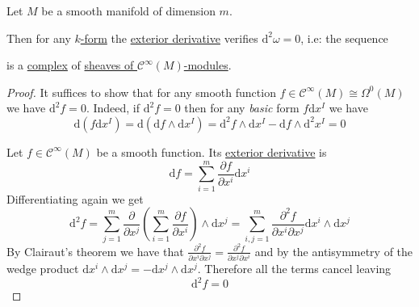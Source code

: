 \documentclass[../../main]{subfiles}
\begin{document}
\begin{lemma} \label{lemma:double-exterior-derivative-is-zero}
  Let \(M\) be a smooth manifold of dimension \(m\).

  Then for any \hyperref[def:smooth-k-form]{\(k\)-form} the \hyperref[def:exterior-derivative-k-form]{exterior derivative} verifies \(\mathrm{d}^{2} \omega = 0\), i.e: the sequence
  \begin{center}
  \end{center}
  is a \hyperref[def:complex]{complex} of \hyperref[def:sheaf-of-modules]{sheaves of \(\mathcal{C}^{\infty}(M)\)-modules}.
\end{lemma}
\begin{proof}
  It suffices to show that for any smooth function \(f \in \mathcal{C}^{\infty}(M) \cong \Omega^{0}(M)\) we have \(\mathrm{d}^{2}f = 0\).
  Indeed, if \(\mathrm{d}^{2}f = 0\) then for any \textit{basic} form \(f\mathrm{d}x^{I}\) we have
  \begin{equation*}
    \mathrm{d}(f\mathrm{d}x^{I}) = \mathrm{d}(\mathrm{d}f \wedge \mathrm{d}x^{I}) = \mathrm{d}^{2}f \wedge \mathrm{d}x^{I} - \mathrm{d}f \wedge \mathrm{d}^{2}x^{I} = 0
  \end{equation*}

  Let \(f \in \mathcal{C}^{\infty}(M)\) be a smooth function.
  Its \hyperref[def:exterior-derivative-k-form]{exterior derivative} is
  \begin{equation*}
    \mathrm{d}f = \sum_{i = 1}^{m} \frac{\partial f}{\partial x^{i}} \mathrm{d}x^{i}
  \end{equation*}
  Differentiating again we get
  \begin{equation*}
    \mathrm{d}^{2}f = \sum_{j=1}^{m} \frac{\partial}{\partial x^{j}} \left( \sum_{i=1}^{m}  \frac{\partial f}{\partial x^{i}} \right) \wedge \mathrm{d}x^{j} = \sum_{i,j=1}^{m} \frac{\partial^{2} f}{\partial x^{i} \partial x^{j}} \mathrm{d}x^{i} \wedge \mathrm{d}x^{j}
  \end{equation*}
  By Clairaut's theorem we have that \( \frac{\partial^{2} f}{\partial x^{i} \partial x^{j}} =  \frac{\partial^{2} f}{\partial x^{j} \partial x^{i}}\) and by the antisymmetry of the wedge product \(\mathrm{d}x^{i} \wedge \mathrm{d}x^{j} = - \mathrm{d}x^{j} \wedge \mathrm{d}x^{j}\).
  Therefore all the terms cancel leaving
  \begin{equation*}
    \mathrm{d}^{2} f = 0
  \end{equation*}
\end{proof}
\end{document}
